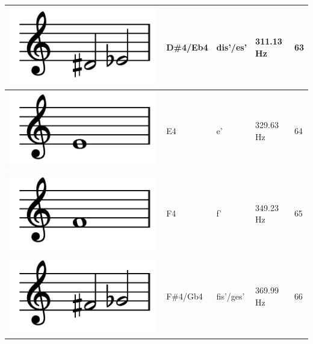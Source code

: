 \documentclass[a4paper, 11pt, twoside]{report}
\theoremstyle{definition}
\begin{document}
\begin{longtable}{ | M{3.5cm} | M{2.8cm} | M{2.8cm} | M{2.5cm} | M{2.2cm} | }
    \includegraphics[width=0.85\linewidth]{assets/notes/DS4.png} & D\#4/Eb4                & dis'/es'               & 311.13 Hz          & 63               \\ \hline
    \includegraphics[width=0.85\linewidth]{assets/notes/E4.png}  & E4                      & e'                     & 329.63 Hz          & 64               \\ \hline
    \includegraphics[width=0.85\linewidth]{assets/notes/F4.png}  & F4                      & f'                     & 349.23 Hz          & 65               \\ \hline
    \includegraphics[width=0.85\linewidth]{assets/notes/FS4.png} & F\#4/Gb4                & fis'/ges'              & 369.99 Hz          & 66               \\ \hline

\end{longtable}
\end{document}
